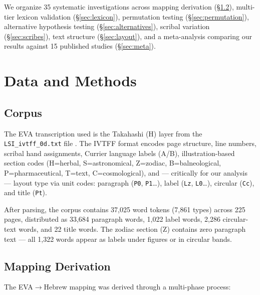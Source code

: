 \documentclass[11pt,a4paper]{article}
\begin{document}
We organize 35 systematic investigations across mapping derivation
(\S\ref{sec:mapping}), multi-tier lexicon validation (\S\ref{sec:lexicon}),
permutation testing (\S\ref{sec:permutation}), alternative hypothesis
testing (\S\ref{sec:alternatives}), scribal variation (\S\ref{sec:scribes}),
text structure (\S\ref{sec:layout}), and a meta-analysis comparing our
results against 15 published studies (\S\ref{sec:meta}).


\section{Data and Methods}
\label{sec:methods}

\subsection{Corpus}
\label{sec:corpus}

The EVA transcription used is the Takahashi (H) layer from the
\texttt{LSI\_ivtff\_0d.txt} file \citep{Landini2001}. The IVTFF format
encodes page structure, line numbers, scribal hand assignments, Currier
language labels (A/B), illustration-based section codes
(H=herbal, S=astronomical, Z=zodiac, B=balneological, P=pharmaceutical,
T=text, C=cosmological), and --- critically for our analysis --- layout type
via unit codes: paragraph (\texttt{P0}, \texttt{P1}\ldots), label
(\texttt{Lz}, \texttt{L0}\ldots), circular (\texttt{Cc}), and title
(\texttt{Pt}).

After parsing, the corpus contains 37,025 word tokens (7,861 types) across
225 pages, distributed as 33,684 paragraph words, 1,022 label words, 2,286
circular-text words, and 22 title words. The zodiac section (Z) contains
zero paragraph text --- all 1,322 words appear as labels under figures or in
circular bands.

\subsection{Mapping Derivation}
\label{sec:mapping}

The EVA$\to$Hebrew mapping was derived through a multi-phase process:
\end{document}
